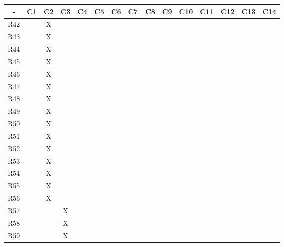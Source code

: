 \newpage

\begin{table}[]
\begin{tabular}{|c|c|c|c|c|c|c|c|c|c|c|c|c|c|c|}
\hline
-   & C1 & C2 & C3 & C4 & C5 & C6 & C7 & C8 & C9 & C10 & C11 & C12 & C13 & C14 \\ \hline
R42 &    & X  &    &    &    &    &    &    &    &     &     &     &     &     \\ \hline
R43 &    & X  &    &    &    &    &    &    &    &     &     &     &     &     \\ \hline
R44 &    & X  &    &    &    &    &    &    &    &     &     &     &     &     \\ \hline
R45 &    & X  &    &    &    &    &    &    &    &     &     &     &     &     \\ \hline
R46 &    & X  &    &    &    &    &    &    &    &     &     &     &     &     \\ \hline
R47 &    & X  &    &    &    &    &    &    &    &     &     &     &     &     \\ \hline
R48 &    & X  &    &    &    &    &    &    &    &     &     &     &     &     \\ \hline
R49 &    & X  &    &    &    &    &    &    &    &     &     &     &     &     \\ \hline
R50 &    & X  &    &    &    &    &    &    &    &     &     &     &     &     \\ \hline
R51 &    & X  &    &    &    &    &    &    &    &     &     &     &     &     \\ \hline
R52 &    & X  &    &    &    &    &    &    &    &     &     &     &     &     \\ \hline
R53 &    & X  &    &    &    &    &    &    &    &     &     &     &     &     \\ \hline
R54 &    & X  &    &    &    &    &    &    &    &     &     &     &     &     \\ \hline
R55 &    & X  &    &    &    &    &    &    &    &     &     &     &     &     \\ \hline
R56 &    & X  &    &    &    &    &    &    &    &     &     &     &     &     \\ \hline
R57 &    &    & X  &    &    &    &    &    &    &     &     &     &     &     \\ \hline
R58 &    &    & X  &    &    &    &    &    &    &     &     &     &     &     \\ \hline
R59 &    &    & X  &    &    &    &    &    &    &     &     &     &     &     \\ \hline

\end{tabular}
\end{table}
